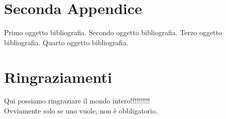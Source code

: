 \documentclass[12pt,a4paper,openright,twoside]{report}
\begin{document}
\chapter{Seconda Appendice}             %
\begin{thebibliography}{90}             %
\rhead[\fancyplain{}{\bfseries \leftmark}]{\fancyplain{}{\bfseries
\thepage}}
 Primo oggetto bibliografia.
 Secondo oggetto bibliografia.
 Terzo oggetto bibliografia.
 Quarto oggetto bibliografia.
\end{thebibliography}
\clearpage{\pagestyle{empty}\cleardoublepage}
\chapter*{Ringraziamenti}
\thispagestyle{empty}
Qui possiamo ringraziare il mondo intero!!!!!!!!!!\\
Ovviamente solo se uno vuole, non \`e obbligatorio.
\end{document}
